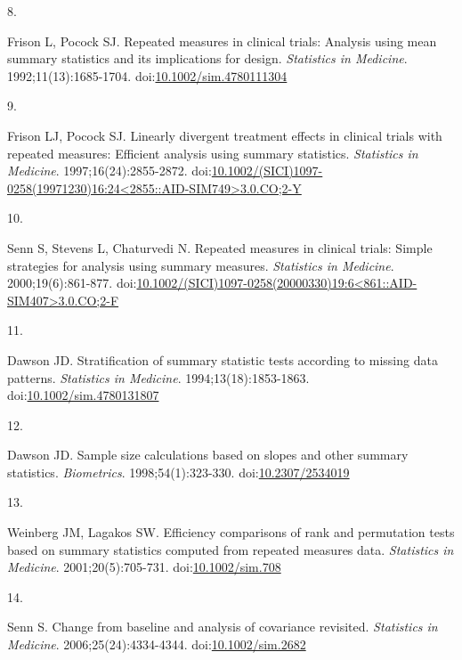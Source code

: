 \documentclass[
  11pt,
]{article}
\newlength{\cslhangindent}
\newlength{\csllabelwidth}
\newenvironment{CSLReferences}[2] %
 {\begin{list}{}{%
  \setlength{\itemindent}{0pt}
  \setlength{\leftmargin}{0pt}
  \setlength{\parsep}{0pt}
  \ifodd #1
   \setlength{\leftmargin}{\cslhangindent}
   \setlength{\itemindent}{-1\cslhangindent}
  \fi
  \setlength{\itemsep}{#2\baselineskip}}}
 {\end{list}}
\newcommand{\CSLLeftMargin}[1]{\parbox[t]{\csllabelwidth}{\strut#1\strut}}
\newcommand{\CSLRightInline}[1]{\parbox[t]{\linewidth - \csllabelwidth}{\strut#1\strut}}
\begin{document}
\begin{CSLReferences}{0}{1}
\CSLLeftMargin{8. }%
\CSLRightInline{Frison L, Pocock SJ. Repeated measures in clinical trials: Analysis using mean summary statistics and its implications for design. \emph{Statistics in Medicine}. 1992;11(13):1685-1704. doi:\href{https://doi.org/10.1002/sim.4780111304}{10.1002/sim.4780111304}}

\CSLLeftMargin{9. }%
\CSLRightInline{Frison LJ, Pocock SJ. Linearly divergent treatment effects in clinical trials with repeated measures: Efficient analysis using summary statistics. \emph{Statistics in Medicine}. 1997;16(24):2855-2872. doi:\href{https://doi.org/10.1002/(SICI)1097-0258(19971230)16:24\%3C2855::AID-SIM749\%3E3.0.CO;2-Y}{10.1002/(SICI)1097-0258(19971230)16:24\textless2855::AID-SIM749\textgreater3.0.CO;2-Y}}

\CSLLeftMargin{10. }%
\CSLRightInline{Senn S, Stevens L, Chaturvedi N. Repeated measures in clinical trials: Simple strategies for analysis using summary measures. \emph{Statistics in Medicine}. 2000;19(6):861-877. doi:\href{https://doi.org/10.1002/(SICI)1097-0258(20000330)19:6\%3C861::AID-SIM407\%3E3.0.CO;2-F}{10.1002/(SICI)1097-0258(20000330)19:6\textless861::AID-SIM407\textgreater3.0.CO;2-F}}

\CSLLeftMargin{11. }%
\CSLRightInline{Dawson JD. Stratification of summary statistic tests according to missing data patterns. \emph{Statistics in Medicine}. 1994;13(18):1853-1863. doi:\href{https://doi.org/10.1002/sim.4780131807}{10.1002/sim.4780131807}}

\CSLLeftMargin{12. }%
\CSLRightInline{Dawson JD. Sample size calculations based on slopes and other summary statistics. \emph{Biometrics}. 1998;54(1):323-330. doi:\href{https://doi.org/10.2307/2534019}{10.2307/2534019}}

\CSLLeftMargin{13. }%
\CSLRightInline{Weinberg JM, Lagakos SW. Efficiency comparisons of rank and permutation tests based on summary statistics computed from repeated measures data. \emph{Statistics in Medicine}. 2001;20(5):705-731. doi:\href{https://doi.org/10.1002/sim.708}{10.1002/sim.708}}

\CSLLeftMargin{14. }%
\CSLRightInline{Senn S. Change from baseline and analysis of covariance revisited. \emph{Statistics in Medicine}. 2006;25(24):4334-4344. doi:\href{https://doi.org/10.1002/sim.2682}{10.1002/sim.2682}}


\end{CSLReferences}
\end{document}
